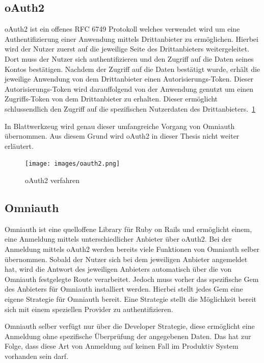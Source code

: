 \documentclass[paper=a4,fontsize=12pt,parskip=half]{scrartcl}
\begin{document}
	\subsection{oAuth2}
	\label{sec: oauth2}
	\gls{oAuth2} ist ein offenes \gls{RFC} 6749 Protokoll welches verwendet wird um eine Authentifizierung einer Anwendung mittels Drittanbieter zu ermöglichen. Hierbei wird der Nutzer zuerst auf die jeweilige Seite des Drittanbieters weitergeleitet. Dort muss der Nutzer sich authentifizieren und den Zugriff auf die Daten seines Kontos bestätigen. Nachdem der Zugriff auf die Daten bestätigt wurde, erhält die jeweilige Anwendung von dem Drittanbieter einen Autorisierungs-Token. Dieser Autorisierungs-Token wird darauffolgend von der Anwendung genutzt um einen Zugriffs-Token von dem Drittanbieter zu erhalten. Dieser ermöglicht schlussendlich den Zugriff auf die spezifischen Nutzerdaten des Drittanbieters.~\ref{fig:oauth2}
	
	In Blattwerkzeug wird genau dieser umfangreiche Vorgang von Omniauth übernommen. Aus diesem Grund wird oAuth2 in dieser Thesis nicht weiter erläutert.
	
	\begin{figure}[h]
		\texttt{[image: images/oauth2.png]}
		\caption{oAuth2 verfahren}
		\label{fig:oauth2}
	\end{figure}

	\subsection{Omniauth}
	\label{sec:omniauth}
	Omniauth ist eine quelloffene Library für Ruby on Rails und ermöglicht einem, eine Anmeldung mittels unterschiedlicher Anbieter über \gls{oAuth2}. Bei der Anmeldung mittels oAuth2 werden bereits viele Funktionen von Omniauth selber übernommen. Sobald der Nutzer sich bei dem jeweiligen Anbieter angemeldet hat, wird die Antwort des jeweiligen Anbieters automatisch über die von Omniauth festgelegte Route verarbeitet. Jedoch muss vorher das spezifische Gem des Anbieters für Omniauth installiert werden. Hierbei stellt jedes Gem eine eigene Strategie für Omniauth bereit. Eine Strategie stellt die Möglichkeit bereit sich mit einem speziellen Provider zu authentifizieren.
	
	
	Omniauth selber verfügt nur über die Developer Strategie, diese ermöglicht eine Anmeldung ohne spezifische Überprüfung der angegebenen Daten. Das hat zur Folge, dass diese Art von Anmeldung auf keinen Fall im Produktiv System vorhanden sein darf.
	
\end{document}
